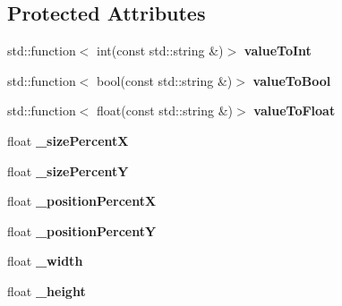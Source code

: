 \subsection*{Protected Attributes}
\begin{DoxyCompactItemize}
\item 
\mbox{\label{classcocostudio_1_1WidgetReader_a2454bf455e6222071725aece1019168e}} 
std\+::function$<$ int(const std\+::string \&)$>$ {\bfseries value\+To\+Int}
\item 
\mbox{\label{classcocostudio_1_1WidgetReader_af541a1237dbf6d37c47b841b8b4dc63c}} 
std\+::function$<$ bool(const std\+::string \&)$>$ {\bfseries value\+To\+Bool}
\item 
\mbox{\label{classcocostudio_1_1WidgetReader_ad84a1faa1ade74ca65de162128e83f4e}} 
std\+::function$<$ float(const std\+::string \&)$>$ {\bfseries value\+To\+Float}
\item 
\mbox{\label{classcocostudio_1_1WidgetReader_a3687ff8051119b69ebb525d127e9db9f}} 
float {\bfseries \+\_\+size\+PercentX}
\item 
\mbox{\label{classcocostudio_1_1WidgetReader_ab7950343af592e27b0170783ec37d4ad}} 
float {\bfseries \+\_\+size\+PercentY}
\item 
\mbox{\label{classcocostudio_1_1WidgetReader_a786585fba4132533f25d36e5d2ee6689}} 
float {\bfseries \+\_\+position\+PercentX}
\item 
\mbox{\label{classcocostudio_1_1WidgetReader_a262b765658a2789e7c88884bfa0db9ee}} 
float {\bfseries \+\_\+position\+PercentY}
\item 
\mbox{\label{classcocostudio_1_1WidgetReader_a71d984281eab73567f67467c15e69e4a}} 
float {\bfseries \+\_\+width}
\item 
\mbox{\label{classcocostudio_1_1WidgetReader_a5d2004283b2090086c766d5ca8f99f3d}} 
float {\bfseries \+\_\+height}
\item 

\end{DoxyCompactItemize}
